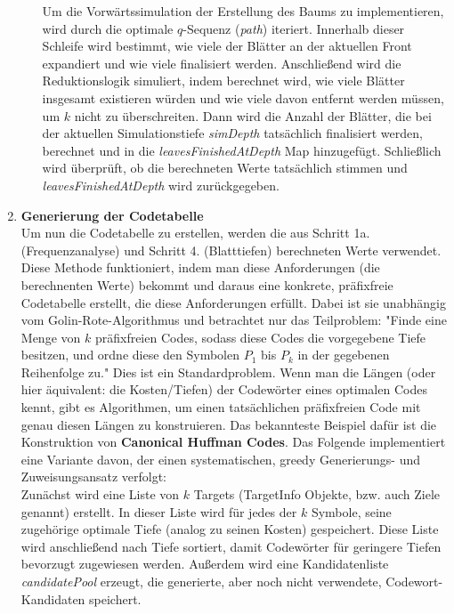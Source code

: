 \documentclass[a4paper,10pt,ngerman]{scrartcl}
\begin{document}
\begin{enumerate}
\begin{enumerate}
    Um die Vorwärtssimulation der Erstellung des Baums zu implementieren, wird durch die optimale $q$-Sequenz (\textit{path}) iteriert. Innerhalb dieser Schleife wird bestimmt, wie viele der Blätter an der aktuellen Front expandiert und wie viele finalisiert werden. Anschließend wird die Reduktionslogik simuliert, indem berechnet wird, wie viele Blätter insgesamt existieren würden und wie viele davon entfernt werden müssen, um $k$ nicht zu überschreiten. Dann wird die Anzahl der Blätter, die bei der aktuellen Simulationstiefe \textit{simDepth} tatsächlich finalisiert werden, berechnet und in die \textit{leavesFinishedAtDepth} Map hinzugefügt. Schließlich wird überprüft, ob die berechneten Werte tatsächlich stimmen und \textit{leavesFinishedAtDepth} wird zurückgegeben.  
  \end{enumerate}
  \item \textbf{Generierung der Codetabelle}\\
  Um nun die Codetabelle zu erstellen, werden die aus Schritt 1a. (Frequenzanalyse) und Schritt 4. (Blatttiefen) berechneten Werte verwendet. Diese Methode funktioniert, indem man diese Anforderungen (die berechnenten Werte) bekommt und daraus eine konkrete, präfixfreie Codetabelle erstellt, die diese Anforderungen erfüllt. Dabei ist sie unabhängig vom Golin-Rote-Algorithmus und betrachtet nur das Teilproblem: "Finde eine Menge von $k$ präfixfreien Codes, sodass diese Codes die vorgegebene Tiefe besitzen, und ordne diese den Symbolen $P_1$ bis $P_k$ in der gegebenen Reihenfolge zu." Dies ist ein Standardproblem. Wenn man die Längen (oder hier äquivalent: die Kosten/Tiefen) der Codewörter eines optimalen Codes kennt, gibt es Algorithmen, um einen tatsächlichen präfixfreien Code mit genau diesen Längen zu konstruieren. Das bekannteste Beispiel dafür ist die Konstruktion von \textbf{Canonical Huffman Codes}. Das Folgende implementiert eine Variante davon, der einen systematischen, greedy Generierungs- und Zuweisungsansatz verfolgt: 
  \\\newline
  Zunächst wird eine Liste von $k$ Targets (TargetInfo Objekte, bzw. auch Ziele genannt) erstellt. In dieser Liste wird für jedes der $k$ Symbole, seine zugehörige optimale Tiefe (analog zu seinen Kosten) gespeichert. Diese Liste wird anschließend nach Tiefe sortiert, damit Codewörter für geringere Tiefen bevorzugt zugewiesen werden. Außerdem wird eine Kandidatenliste \textit{candidatePool} erzeugt, die generierte, aber noch nicht verwendete, Codewort-Kandidaten speichert. \\

\end{enumerate}
\end{document}
